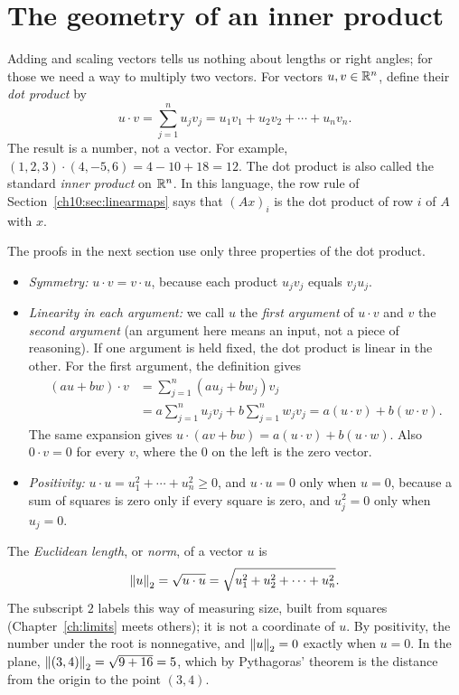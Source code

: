 \section{The geometry of an inner product}\label{ch10:sec:inner}
Adding and scaling vectors tells us nothing about lengths or right angles; for those we need a way to multiply two vectors. For vectors $u,v\in\mathbb R^n$, define their \emph{dot product} by
\[
u\cdot v=\sum_{j=1}^n u_jv_j=u_1v_1+u_2v_2+\cdots+u_nv_n.
\]
The result is a number, not a vector. For example, $(1,2,3)\cdot(4,-5,6)=4-10+18=12$. The dot product is also called the standard \emph{inner product} on $\mathbb R^n$. In this language, the row rule of Section~\ref{ch10:sec:linearmaps} says that $(Ax)_i$ is the dot product of row $i$ of $A$ with $x$.

The proofs in the next section use only three properties of the dot product.
\begin{itemize}
\item \emph{Symmetry:} $u\cdot v=v\cdot u$, because each product $u_jv_j$ equals $v_ju_j$.
\item \emph{Linearity in each argument:} we call $u$ the \emph{first argument} of $u\cdot v$ and $v$ the \emph{second argument} (an argument here means an input, not a piece of reasoning). If one argument is held fixed, the dot product is linear in the other. For the first argument, the definition gives
\begin{align*}
(au+bw)\cdot v
&=\sum_{j=1}^n(au_j+bw_j)v_j\\
&=a\sum_{j=1}^n u_jv_j+b\sum_{j=1}^n w_jv_j
=a(u\cdot v)+b(w\cdot v).
\end{align*}
The same expansion gives $u\cdot(av+bw)=a(u\cdot v)+b(u\cdot w)$. Also $0\cdot v=0$ for every $v$, where the $0$ on the left is the zero vector.
\item \emph{Positivity:} $u\cdot u=u_1^2+\cdots+u_n^2\ge0$, and $u\cdot u=0$ only when $u=0$, because a sum of squares is zero only if every square is zero, and $u_j^2=0$ only when $u_j=0$.
\end{itemize}

The \emph{Euclidean length}, or \emph{norm}, of a vector $u$ is
\[
\left\|u\right\|_2=\sqrt{u\cdot u}=\sqrt{u_1^2+u_2^2+\cdots+u_n^2}.
\]
The subscript $2$ labels this way of measuring size, built from squares (Chapter~\ref{ch:limits} meets others); it is not a coordinate of $u$. By positivity, the number under the root is nonnegative, and $\left\|u\right\|_2=0$ exactly when $u=0$. In the plane, $\left\|(3,4)\right\|_2=\sqrt{9+16}=5$, which by Pythagoras' theorem is the distance from the origin to the point $(3,4)$.

